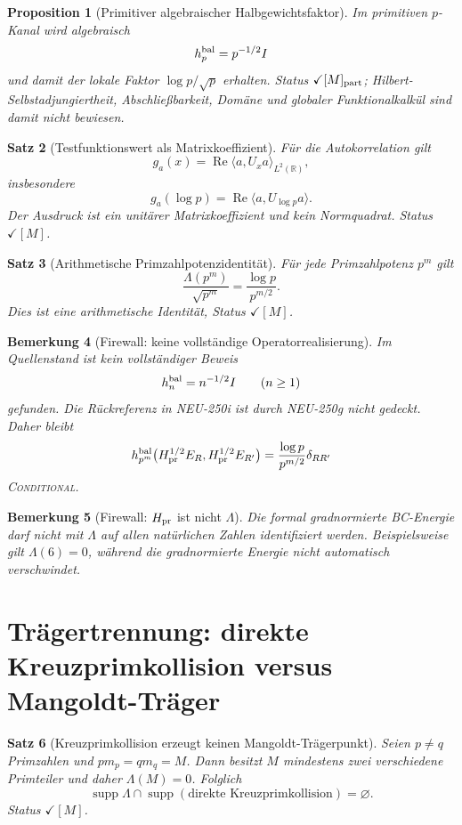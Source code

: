 \documentclass[11pt,a4paper]{amsart}
\newtheorem{theorem}{Satz}[section]
\newtheorem{proposition}[theorem]{Proposition}
\newtheorem{remark}[theorem]{Bemerkung}
\newcommand{\stM}{\ensuremath{\checkmark[M]}}
\newcommand{\stMpart}{\ensuremath{\checkmark[M]_{\rm part}}}
\newcommand{\Conditional}{\textsc{Conditional}}
\begin{document}
\begin{proposition}[Primitiver algebraischer Halbgewichtsfaktor]
Im primitiven $p$-Kanal wird algebraisch
\[
h_p^{\rm bal}=p^{-1/2}I
\]
und damit der lokale Faktor $\log p/\sqrt p$ erhalten. Status \stMpart;
Hilbert-Selbstadjungiertheit, Abschließbarkeit, Domäne und globaler
Funktionalkalkül sind damit nicht bewiesen.
\end{proposition}

\begin{theorem}[Testfunktionswert als Matrixkoeffizient]
Für die Autokorrelation gilt
\[
g_a(x)=\operatorname{Re}\langle a,U_xa\rangle_{L^2(\mathbb R)},
\]
insbesondere
\[
\boxed{g_a(\log p)=\operatorname{Re}\langle a,U_{\log p}a\rangle.}
\]
Der Ausdruck ist ein unitärer Matrixkoeffizient und kein Normquadrat. Status
\stM.
\end{theorem}

\begin{theorem}[Arithmetische Primzahlpotenzidentität]
\label{thm:mangoldt-primepower}
Für jede Primzahlpotenz $p^m$ gilt
\[
\boxed{\frac{\Lambda(p^m)}{\sqrt{p^m}}
=\frac{\log p}{p^{m/2}}.}
\]
Dies ist eine arithmetische Identität, Status \stM.
\end{theorem}

\begin{remark}[Firewall: keine vollständige Operatorrealisierung]
Im Quellenstand ist kein vollständiger Beweis
\[
h_n^{\rm bal}=n^{-1/2}I\qquad(n\ge1)
\]
gefunden. Die Rückreferenz in NEU-250i ist durch NEU-250g nicht gedeckt.
Daher bleibt
\[
h_{p^m}^{\rm bal}\bigl(H_{\rm pr}^{1/2}E_R,H_{\rm pr}^{1/2}E_{R'}\bigr)
=\frac{\log p}{p^{m/2}}\delta_{RR'}
\]
\Conditional.
\end{remark}

\begin{remark}[Firewall: $H_{\rm pr}$ ist nicht $\Lambda$]
Die formal gradnormierte BC-Energie darf nicht mit $\Lambda$ auf allen
natürlichen Zahlen identifiziert werden. Beispielsweise gilt $\Lambda(6)=0$,
während die gradnormierte Energie nicht automatisch verschwindet.
\end{remark}

\section{Trägertrennung: direkte Kreuzprimkollision versus Mangoldt-Träger}

\begin{theorem}[Kreuzprimkollision erzeugt keinen Mangoldt-Trägerpunkt]
\label{thm:support-separation}
Seien $p\neq q$ Primzahlen und $pm_p=qm_q=M$. Dann besitzt $M$ mindestens
zwei verschiedene Primteiler und daher $\Lambda(M)=0$. Folglich
\[
\boxed{\operatorname{supp}\Lambda\cap
\operatorname{supp}(\text{direkte Kreuzprimkollision})=\varnothing.}
\]
Status \stM.
\end{theorem}
\end{document}
